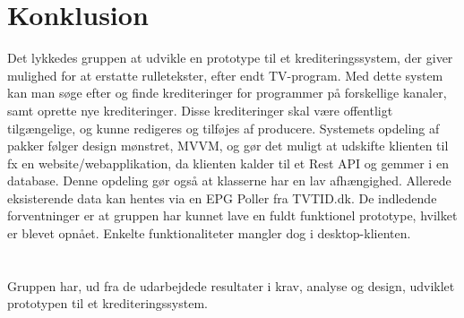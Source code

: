 \section{Konklusion}

Det lykkedes gruppen at udvikle en prototype til et krediteringssystem, der giver mulighed for at erstatte rulletekster, efter endt TV-program. Med dette system kan man søge efter og finde krediteringer for programmer på forskellige kanaler, samt oprette nye krediteringer. Disse krediteringer skal være offentligt tilgængelige, og kunne redigeres og tilføjes af producere. Systemets opdeling af pakker følger design mønstret, MVVM, og gør det muligt at udskifte klienten til fx en website/webapplikation, da klienten kalder til et Rest API og gemmer i en database. Denne opdeling gør også at klasserne har en lav afhængighed. Allerede eksisterende data kan hentes via en EPG Poller fra TVTID.dk.
De indledende forventninger er at gruppen har kunnet lave en fuldt funktionel prototype, hvilket er blevet opnået. Enkelte funktionaliteter mangler dog i desktop-klienten. \\
 \\
 \\
Gruppen har, ud fra de udarbejdede resultater i krav, analyse og design, udviklet prototypen til et krediteringssystem.\\

\\

 \\ %